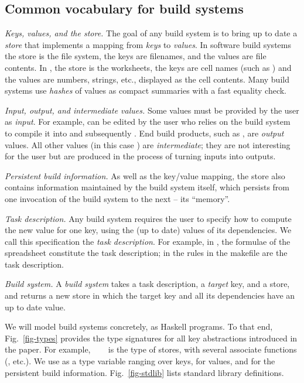 \vspace{-1.5mm}
\subsection{Common vocabulary for build systems}\label{sec-vocabulary}
\vspace{-0.5mm}

\emph{Keys, values, and the store.} The goal of any build system is to
bring up to date a \emph{store} that implements a mapping from \emph{keys} to
\emph{values}. In software build systems the store is the file system, the
keys are filenames, and the values are file contents. In \Excel, the store is
the worksheets, the keys are cell names (such as ) and the values are
numbers, strings, etc., displayed as the cell contents. Many build systems use
\emph{hashes} of values as compact summaries with a fast equality check.

\emph{Input, output, and intermediate values.} Some values must be provided by
the user as \emph{input}. For example,  can be edited by the user
who relies on the build system to compile it into  and subsequently
. End build products, such as , are \emph{output}
values. All other values (in this case ) are \emph{intermediate};
they are not interesting for the user but are produced in the process of turning
inputs into outputs.

\emph{Persistent build information.} As well as the key/value mapping, the
store also contains information maintained by the build system itself, which
persists from one invocation of the build system to the next -- its ``memory''.

\emph{Task description.} Any build system requires the user to specify how
to compute the new value for one key, using the (up to date) values of its
dependencies. We call this specification the \emph{task description}. For
example, in \Excel, the formulae of the spreadsheet constitute the task
description; in \Make the rules in the makefile are the task description.

\emph{Build system.} A \emph{build system} takes a task description, a
\emph{target} key, and a store, and returns a new store in which the target key
and all its dependencies have an up to date value.

We will model build systems concretely, as Haskell programs. To that end,
Fig.~\ref{fig-types} provides the type signatures for all key abstractions
introduced in the paper. For example, ~~~ is the
type of stores, with several associate functions (, etc.). We use
 as a type variable ranging over keys,  for values, and  for
the persistent build information. Fig.~\ref{fig-stdlib} lists standard library
definitions.

